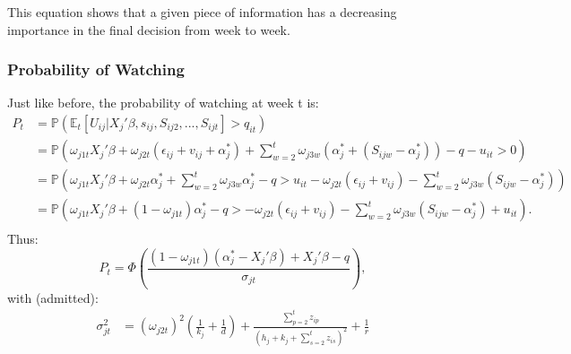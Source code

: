 	This equation shows that a given piece of information has a decreasing importance in the final decision from week to week.\\
	
	\subsubsection{Probability of Watching}
	Just like before, the probability of watching at week t is:
	\begin{align*}
		P_{t}&=\mathbb{P}(\mathbb{E}_t[U_{i j}|X_{j}'\beta, s_{i j}, S_{i j 2}, ..., S_{i j t}]>q_{i t})\\
		&=\mathbb{P}\left(\omega_{j 1 t}X_{j}'\beta +\omega_{j 2 t}(\epsilon_{i j}+v_{i j}+\alpha_{j}^{*})+\sum_{w=2}^{t}\omega_{j 3 w}(\alpha_{j}^{*}+(S_{i j w}-\alpha_{j}^{*}))-q-u_{i t}>0\right)\\
		&=\mathbb{P}\left(\omega_{j 1 t}X_{j}'\beta +\omega_{j 2 t}\alpha_{j}^{*}+\sum_{w=2}^{t}\omega_{j 3 w}\alpha_{j}^{*}-q
		>u_{i t}-\omega_{j 2 t}(\epsilon_{i j}+v_{i j})-\sum_{w=2}^{t}\omega_{j 3 w}(S_{i j w}-\alpha_{j}^{*})\right)\\
		&=\mathbb{P}\left(\omega_{j 1 t}X_{j}'\beta +(1-\omega_{j 1 t})\alpha_{j}^{*}-q
		>-\omega_{j 2 t}(\epsilon_{i j}+v_{i j})-\sum_{w=2}^{t}\omega_{j 3 w}(S_{i j w}-\alpha_{j}^{*})+u_{i t}\right).\\
	\end{align*}
	Thus:
	\begin{equation}
		P_{t}=\Phi\left(\frac{(1-\omega_{j 1 t})(\alpha_{j}^{*}-X_{j}'\beta)+X_{j}'\beta-q}{\sigma_{j t}}\right),
	\end{equation}
	with (admitted):
	\begin{align*}
		\sigma_{j t}^{2}
		&=(\omega_{j 2 t })^{2}\left(\frac{1}{k_{j}}+\frac{1}{d}\right)+\frac{\sum_{p=2}^{t}z_{i p}}{(h_{j}+k_{j}+\sum_{s=2}^{t}z_{i s})^{2}}+\frac{1}{r}
	\end{align*}
	
